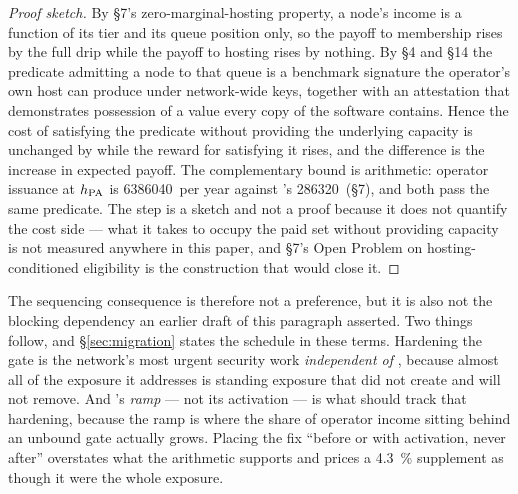 \begin{proof}[Proof sketch]
By \S7's zero-marginal-hosting property, a node's \PNR income is a function of its tier and its queue
position only, so the payoff to membership rises by the full drip while the payoff to hosting rises
by nothing. By \S4 and \S14 the predicate admitting a node to that queue is a benchmark signature the
operator's own host can produce under network-wide keys, together with an attestation that
demonstrates possession of a value every copy of the software contains. Hence the cost of satisfying
the predicate without providing the underlying capacity is unchanged by \PNR while the reward for
satisfying it rises, and the difference is the increase in expected payoff. The complementary bound
is arithmetic: operator issuance at $h_{\mathrm{PA}}$ is \num{6386040}\flux\ per year against \PNR's
\num{286320}\flux\ (\S7), and both pass the same predicate. The step is a sketch and not a proof because it does not quantify
the cost side --- what it takes to occupy the paid set without providing capacity is not measured
anywhere in this paper, and \S7's Open Problem on hosting-conditioned eligibility is the construction
that would close it.
\end{proof}

The sequencing consequence is therefore not a preference, but it is also not the blocking dependency
an earlier draft of this paragraph asserted. Two things follow, and \S\ref{sec:migration} states the
schedule in these terms. Hardening the gate is the network's most urgent security work
\emph{independent of \PNR}, because almost all of the exposure it addresses is standing exposure that
\PNR{} did not create and will not remove. And \PNR's \emph{ramp} --- not its activation --- is what
should track that hardening, because the ramp is where the share of operator income sitting behind an
unbound gate actually grows. Placing the fix ``before or with activation, never after'' overstates
what the arithmetic supports and prices a \SI{4.3}{\percent} supplement as though it were the whole
exposure.

